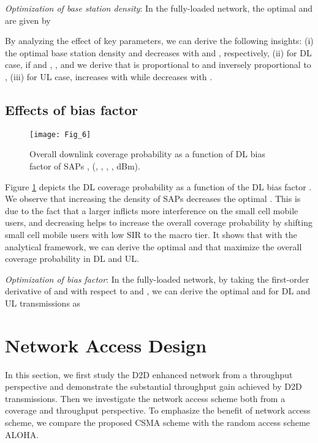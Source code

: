 \documentclass[twocolumn,english]{IEEEtran}
\theoremstyle{plain}
\theoremstyle{definition}
\begin{document}
\emph{Optimization of base station density}: In the fully-loaded network,
the optimal 
and 
are given by




By analyzing the effect of key parameters, we can derive the following
insights: (i) the optimal base station density 
and  decreases
with  and ,
respectively, (ii) for DL case, if 
and , ,
and we derive that 
is proportional to  and inversely proportional
to , (iii) for UL case, 
increases with  while decreases with .


\subsection{Effects of bias factor}

\begin{figure}[t]
\centering \texttt{[image: Fig\_6]}

\protect\caption{\label{fig:Cove-bias-fully-half}Overall downlink coverage probability
as a function of DL bias factor of SAPs , (,
, ,
,  dBm).}
\end{figure}


Figure \ref{fig:Cove-bias-fully-half} depicts the DL coverage probability
as a function of the DL bias factor . We observe
that increasing the density of SAPs  decreases
the optimal . This is due to the fact that a larger
 inflicts more interference on the small cell
mobile users, and decreasing  helps to increase
the overall coverage probability by shifting small cell mobile users
with low SIR to the macro tier. It shows that with the analytical
framework, we can derive the optimal 
and  that maximize the overall
coverage probability in DL and UL.

\emph{Optimization of bias factor}: In the fully-loaded network, by
taking the first-order derivative of 
and  with respect to 
and , we can derive the optimal
 and 
for DL and UL transmissions as





\section{Network Access Design }

In this section, we first study the D2D enhanced network from a throughput
perspective and demonstrate the substantial throughput gain achieved
by D2D transmissions. Then we investigate the network access scheme
both from a coverage and throughput perspective. To emphasize the
benefit of network access scheme, we compare the proposed CSMA scheme
with the random access scheme ALOHA.
\end{document}
